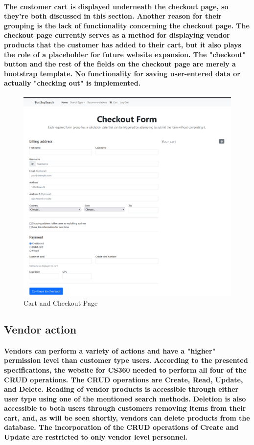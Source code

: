 \documentclass[sigconf]{acmart}
\begin{document}
\paragraph{ The customer cart is displayed underneath the checkout page, so they're both discussed in this section. Another reason for their grouping is the lack of functionality concerning the checkout page. The checkout page currently serves as a method for displaying vendor products that the customer has added to their cart, but it also plays the role of a placeholder for future website expansion. The "checkout" button and the rest of the fields on the checkout page are merely a bootstrap template. No functionality for saving user-entered data or actually "checking out" is implemented. }    
\begin{figure}[H]
    \centering
    \includegraphics[scale=0.2]{Cart.PNG}
    \caption{Cart and Checkout Page}
    \label{fig:my_label}
\end{figure}

\subsection{Vendor action}

\paragraph{ Vendors can perform a variety of actions and have a "higher" permission level than customer type users. According to the presented specifications, the website for CS360 needed to perform all four of the CRUD operations. The CRUD operations are Create, Read, Update, and Delete. Reading of vendor products is accessible through either user type using one of the mentioned search methods. Deletion is also accessible to both users through customers removing items from their cart, and, as will be seen shortly, vendors can delete products from the database. The incorporation of the CRUD operations of Create and Update are restricted to only vendor level personnel. } 
\end{document}
